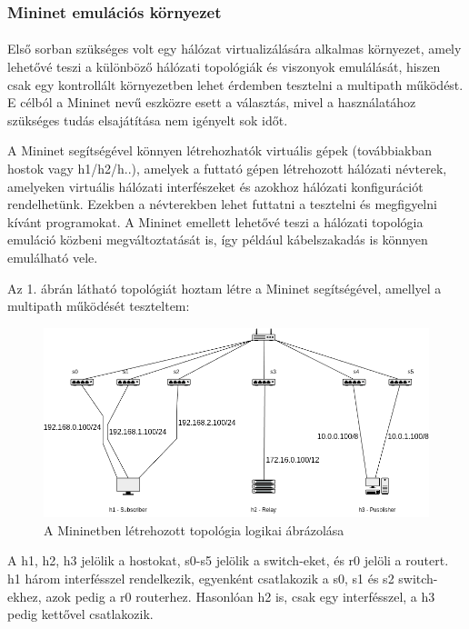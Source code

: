 \documentclass[a4paper,oneside]{article}
\begin{document}
\subsubsection{Mininet emulációs környezet}

 \paragraph{}

 Első sorban szükséges volt egy hálózat virtualizálására alkalmas környezet,
amely lehetővé teszi a különböző hálózati topológiák és viszonyok emulálását, 
hiszen csak egy kontrollált környezetben 
lehet érdemben tesztelni a multipath működést. 
E célból a Mininet nevű eszközre esett a választás, mivel a használatához szükséges 
tudás elsajátítása nem igényelt sok időt.

A Mininet segítségével könnyen létrehozhatók virtuális gépek (továbbiakban hostok vagy h1/h2/h..), 
amelyek a futtató gépen létrehozott hálózati névterek, amelyeken virtuális
hálózati interfészeket és azokhoz hálózati konfigurációt rendelhetünk.
Ezekben a névterekben lehet futtatni a tesztelni és megfigyelni kívánt programokat.
A Mininet emellett lehetővé teszi a hálózati topológia 
emuláció közbeni megváltoztatását is, így például kábelszakadás 
is könnyen emulálható vele. \cite{mininet}

Az 1. ábrán látható topológiát hoztam létre a Mininet segítségével, amellyel a multipath működését teszteltem:

\begin{figure}[h]
  \centering
    \includegraphics[width=15cm]{topoX}
\caption{A Mininetben létrehozott topológia logikai ábrázolása}
\end{figure}
 
A h1, h2, h3 jelölik a hostokat, s0-s5 jelölik a switch-eket, és r0 jelöli a routert.
h1 három interfésszel rendelkezik, egyenként csatlakozik a s0, s1 és s2 switch-ekhez, azok pedig a r0 routerhez.
Hasonlóan h2 is, csak egy interfésszel, a h3 pedig kettővel csatlakozik.
\end{document}
